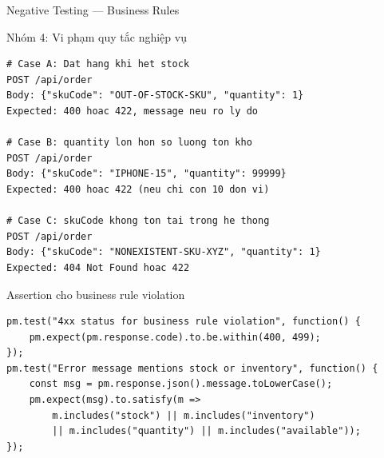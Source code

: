 \documentclass[aspectratio=169,10pt]{beamer}
\begin{document}
\begin{frame}[fragile]{Negative Testing --- Business Rules}
  \begin{block}{Nhóm 4: Vi phạm quy tắc nghiệp vụ}
\begin{lstlisting}[style=bash]
# Case A: Dat hang khi het stock
POST /api/order
Body: {"skuCode": "OUT-OF-STOCK-SKU", "quantity": 1}
Expected: 400 hoac 422, message neu ro ly do

# Case B: quantity lon hon so luong ton kho
POST /api/order
Body: {"skuCode": "IPHONE-15", "quantity": 99999}
Expected: 400 hoac 422 (neu chi con 10 don vi)

# Case C: skuCode khong ton tai trong he thong
POST /api/order
Body: {"skuCode": "NONEXISTENT-SKU-XYZ", "quantity": 1}
Expected: 404 Not Found hoac 422
\end{lstlisting}
  \end{block}

  \begin{exampleblock}{Assertion cho business rule violation}
\begin{lstlisting}[style=nonumber]
pm.test("4xx status for business rule violation", function() {
    pm.expect(pm.response.code).to.be.within(400, 499);
});
pm.test("Error message mentions stock or inventory", function() {
    const msg = pm.response.json().message.toLowerCase();
    pm.expect(msg).to.satisfy(m =>
        m.includes("stock") || m.includes("inventory")
        || m.includes("quantity") || m.includes("available"));
});
\end{lstlisting}
  \end{exampleblock}
\end{frame}
\end{document}
